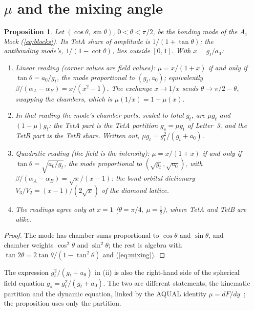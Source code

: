 \documentclass[twocolumn]{iopjournal}
\newtheorem{proposition}{Proposition}
\theoremstyle{definition}
\theoremstyle{remark}
\begin{document}

\section{$\mu$ and the mixing angle}

\begin{proposition}
\label{prop:mu}
Let $(\cos\theta, \sin\theta)$, $0 < \theta < \pi/2$, be the bonding mode
of the $A_1$ block (\ref{eq:blocks}). Its TetA share of amplitude is $1/(1
+ \tan\theta)$; the antibonding mode's, $1/(1 - \cot\theta)$, lies outside
$[0, 1]$. With $x = g_t/a_0$:
\begin{enumerate}
\item[(i)] \emph{Linear reading} (corner values are field values): $\mu =
  x/(1+x)$ if and only if $\tan\theta = a_0/g_t$, the mode proportional to
  $(g_t, a_0)$; equivalently $\beta/(\alpha_A - \alpha_B) = x/(x^2-1)$. The
  exchange $x \to 1/x$ sends $\theta \to \pi/2 - \theta$, swapping the
  chambers, which is $\mu(1/x) = 1 - \mu(x)$.
\item[(ii)] In that reading the mode's chamber parts, scaled to total
  $g_t$, are $\mu g_t$ and $(1 - \mu)g_t$: the TetA part is the TetA
  partition $g_s = \mu g_t$ of Letter~3, and the TetB part is the TetB
  share. Written out, $\mu g_t = g_t^2/(g_t + a_0)$.
\item[(iii)] \emph{Quadratic reading} (the field is the intensity): $\mu =
  x/(1+x)$ if and only if $\tan\theta = \sqrt{a_0/g_t}$, the mode
  proportional to $(\sqrt{g_t}, \sqrt{a_0})$, with $\beta/(\alpha_A -
  \alpha_B) = \sqrt x/(x-1)$: the bond-orbital dictionary $V_3/V_2 = (x -
  1)/(2\sqrt x)$ of the diamond lattice.
\item[(iv)] The readings agree only at $x = 1$ ($\theta = \pi/4$, $\mu =
  \frac12$), where TetA and TetB are alike.
\end{enumerate}
\end{proposition}

\begin{proof}
The mode has chamber sums proportional to $\cos\theta$ and $\sin\theta$,
and chamber weights $\cos^2\theta$ and $\sin^2\theta$; the rest is algebra
with $\tan 2\theta = 2\tan\theta/(1 - \tan^2\theta)$ and (\ref{eq:mixing}).
\end{proof}

The expression $g_t^2/(g_t + a_0)$ in (ii) is also the right-hand side of
the spherical field equation $g_s = g_t^2/(g_t + a_0)$. The two are
different statements, the kinematic partition and the dynamic equation,
linked by the AQUAL identity $\mu = dF/dy$~\cite{NelsonColes}; the
proposition uses only the partition.
\end{document}
